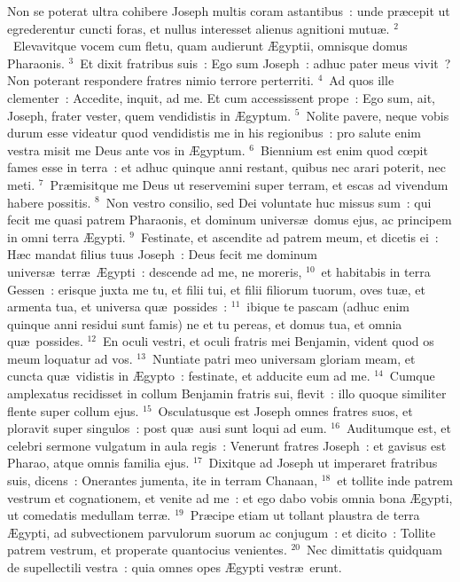\lettrine[lines=3,image=true,loversize=0.05,lraise=-0.03]{N}{}on se poterat ultra cohibere Joseph multis coram astantibus~: unde pr\ae cepit ut egrederentur cuncti foras, et nullus interesset alienus agnitioni mutu\ae .
${}^{2}$~Elevavitque vocem cum fletu, quam audierunt \AE gyptii, omnisque domus Pharaonis.
${}^{3}$~Et dixit fratribus suis~: Ego sum Joseph~: adhuc pater meus vivit~? Non poterant respondere fratres nimio terrore perterriti.
${}^{4}$~Ad quos ille clementer~: Accedite, inquit, ad me. Et cum accessissent prope~: Ego sum, ait, Joseph, frater vester, quem vendidistis in \AE gyptum.
${}^{5}$~Nolite pavere, neque vobis durum esse videatur quod vendidistis me in his regionibus~: pro salute enim vestra misit me Deus ante vos in \AE gyptum.
${}^{6}$~Biennium est enim quod cœpit fames esse in terra~: et adhuc quinque anni restant, quibus nec arari poterit, nec meti.
${}^{7}$~Pr\ae misitque me Deus ut reservemini super terram, et escas ad vivendum habere possitis.
${}^{8}$~Non vestro consilio, sed Dei voluntate huc missus sum~: qui fecit me quasi patrem Pharaonis, et dominum univers\ae\ domus ejus, ac principem in omni terra \AE gypti.
${}^{9}$~Festinate, et ascendite ad patrem meum, et dicetis ei~: H\ae c mandat filius tuus Joseph~: Deus fecit me dominum univers\ae\ terr\ae\ \AE gypti~: descende ad me, ne moreris,
${}^{10}$~et habitabis in terra Gessen~: erisque juxta me tu, et filii tui, et filii filiorum tuorum, oves tu\ae , et armenta tua, et universa qu\ae\ possides~:
${}^{11}$~ibique te pascam (adhuc enim quinque anni residui sunt famis) ne et tu pereas, et domus tua, et omnia qu\ae\ possides.
${}^{12}$~En oculi vestri, et oculi fratris mei Benjamin, vident quod os meum loquatur ad vos.
${}^{13}$~Nuntiate patri meo universam gloriam meam, et cuncta qu\ae\ vidistis in \AE gypto~: festinate, et adducite eum ad me.
${}^{14}$~Cumque amplexatus recidisset in collum Benjamin fratris sui, flevit~: illo quoque similiter flente super collum ejus.
${}^{15}$~Osculatusque est Joseph omnes fratres suos, et ploravit super singulos~: post qu\ae\ ausi sunt loqui ad eum.
${}^{16}$~Auditumque est, et celebri sermone vulgatum in aula regis~: Venerunt fratres Joseph~: et gavisus est Pharao, atque omnis familia ejus.
${}^{17}$~Dixitque ad Joseph ut imperaret fratribus suis, dicens~: Onerantes jumenta, ite in terram Chanaan,
${}^{18}$~et tollite inde patrem vestrum et cognationem, et venite ad me~: et ego dabo vobis omnia bona \AE gypti, ut comedatis medullam terr\ae .
${}^{19}$~Pr\ae cipe etiam ut tollant plaustra de terra \AE gypti, ad subvectionem parvulorum suorum ac conjugum~: et dicito~: Tollite patrem vestrum, et properate quantocius venientes.
${}^{20}$~Nec dimittatis quidquam de supellectili vestra~: quia omnes opes \AE gypti vestr\ae\ erunt.


